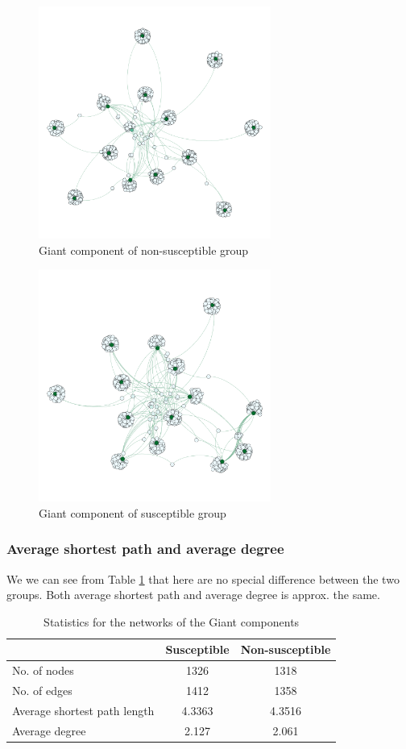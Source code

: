 \documentclass[10pt]{IEEEtran}
\begin{document}
\begin{figure}[H]
  \centering
  \includegraphics[width=3.0in]{non_rec_giant_component}
  \caption{Giant component of non-susceptible group}
  \label{fig:giant_comp_non_sus}
\end{figure}


\begin{figure}[H]
  \centering
  \includegraphics[width=3.0in]{rec_giant_component}
  \caption{Giant component of susceptible group}
  \label{fig:giant_comp_sus}
\end{figure} 

\subsubsection{Average shortest path and average degree}
We we can see from Table \ref{tab:networkKeyNumbers} that here are no special difference between the two groups.  Both average shortest path and average degree is approx. the same.


\begin{table}[H]
\centering
\begin{tabular}{lcc}
\hline
                      & Susceptible & Non-susceptible \\ \hline
No. of nodes          & 1326        & 1318            \\
No. of edges          & 1412        & 1358            \\
Average shortest path length & 4.3363      & 4.3516          \\
Average degree        & 2.127       & 2.061           \\ \hline
\end{tabular}
\caption{Statistics for the networks of the Giant components}
\label{tab:networkKeyNumbers}
\end{table}
\end{document}
